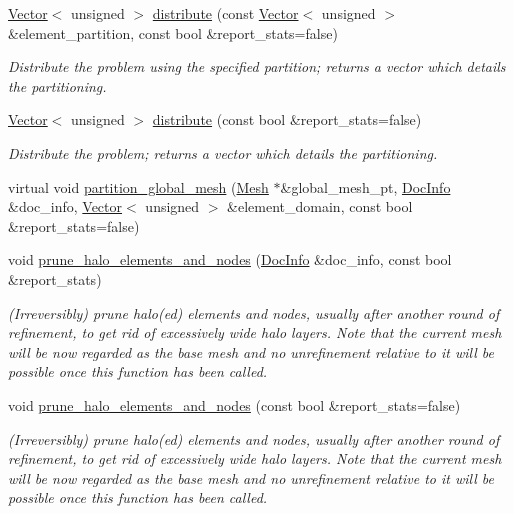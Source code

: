 \begin{DoxyCompactItemize}
\hyperlink{classoomph_1_1Vector}{Vector}$<$ unsigned $>$ \hyperlink{classoomph_1_1Problem_aa35f7ff2b0075cfd4dda519858a65d6c}{distribute} (const \hyperlink{classoomph_1_1Vector}{Vector}$<$ unsigned $>$ \&element\+\_\+partition, const bool \&report\+\_\+stats=false)
\begin{DoxyCompactList}\small\item\em Distribute the problem using the specified partition; returns a vector which details the partitioning. \end{DoxyCompactList}\item 
\hyperlink{classoomph_1_1Vector}{Vector}$<$ unsigned $>$ \hyperlink{classoomph_1_1Problem_af0365ddbe425b730ece6a575db1cd7dd}{distribute} (const bool \&report\+\_\+stats=false)
\begin{DoxyCompactList}\small\item\em Distribute the problem; returns a vector which details the partitioning. \end{DoxyCompactList}\item 
virtual void \hyperlink{classoomph_1_1Problem_ad29fc4bc4d4bead472059765fbbd3b11}{partition\+\_\+global\+\_\+mesh} (\hyperlink{classoomph_1_1Mesh}{Mesh} $\ast$\&global\+\_\+mesh\+\_\+pt, \hyperlink{classoomph_1_1DocInfo}{Doc\+Info} \&doc\+\_\+info, \hyperlink{classoomph_1_1Vector}{Vector}$<$ unsigned $>$ \&element\+\_\+domain, const bool \&report\+\_\+stats=false)
\item 
void \hyperlink{classoomph_1_1Problem_a8c5982a9323392e31a166e23a0c7f0a3}{prune\+\_\+halo\+\_\+elements\+\_\+and\+\_\+nodes} (\hyperlink{classoomph_1_1DocInfo}{Doc\+Info} \&doc\+\_\+info, const bool \&report\+\_\+stats)
\begin{DoxyCompactList}\small\item\em (Irreversibly) prune halo(ed) elements and nodes, usually after another round of refinement, to get rid of excessively wide halo layers. Note that the current mesh will be now regarded as the base mesh and no unrefinement relative to it will be possible once this function has been called. \end{DoxyCompactList}\item 
void \hyperlink{classoomph_1_1Problem_a977f74f132157959d30e82cfcad41a97}{prune\+\_\+halo\+\_\+elements\+\_\+and\+\_\+nodes} (const bool \&report\+\_\+stats=false)
\begin{DoxyCompactList}\small\item\em (Irreversibly) prune halo(ed) elements and nodes, usually after another round of refinement, to get rid of excessively wide halo layers. Note that the current mesh will be now regarded as the base mesh and no unrefinement relative to it will be possible once this function has been called. \end{DoxyCompactList}\item 

\end{DoxyCompactItemize}
